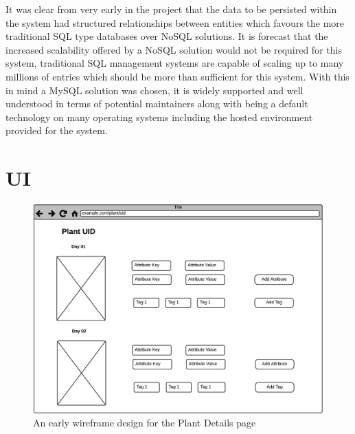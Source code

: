 It was clear from very early in the project that the data to be persisted within the system had structured relationships between entities which favours the more traditional SQL type databases over NoSQL solutions. It is forecast that the increased scalability offered by a NoSQL solution would not be required for this system, traditional SQL management systems are capable of scaling up to many millions of entries which should be more than sufficient for this system. With this in mind a MySQL solution was chosen, it is widely supported and well understood in terms of potential maintainers along with being a default technology on many operating systems including the hosted environment provided for the system.


\section{UI}
\begin{figure}[H]
    \centering
    \includegraphics[width=\textwidth]{images/design/ui1}
    \caption{An early wireframe design for the Plant Details page}
    \label{fig:ui1}
\end{figure}

